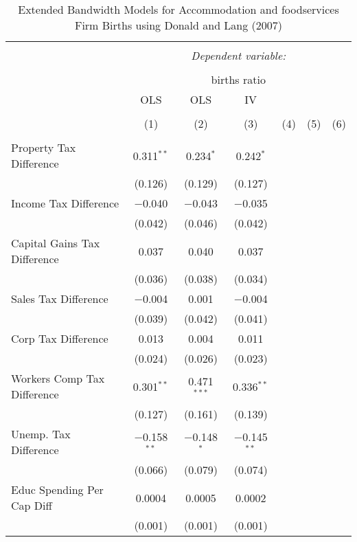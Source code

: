 
\begin{table}[!htbp] \centering 
  \caption{Extended Bandwidth Models for  Accommodation and foodservices Firm Births using Donald and Lang (2007)} 
  \label{} 
\begin{tabular}{@{\extracolsep{5pt}}lcccccc} 
\\[-1.8ex]\hline 
\hline \\[-1.8ex] 
 & \multicolumn{6}{c}{\textit{Dependent variable:}} \\ 
\cline{2-7} 
\\[-1.8ex] & \multicolumn{6}{c}{births ratio} \\ 
 & OLS & OLS & IV &  &  &  \\ 
\\[-1.8ex] & (1) & (2) & (3) & (4) & (5) & (6)\\ 
\hline \\[-1.8ex] 
 Property Tax Difference & 0.311$^{**}$ & 0.234$^{*}$ & 0.242$^{*}$ &  &  &  \\ 
  & (0.126) & (0.129) & (0.127) &  &  &  \\ 
  Income Tax Difference & $-$0.040 & $-$0.043 & $-$0.035 &  &  &  \\ 
  & (0.042) & (0.046) & (0.042) &  &  &  \\ 
  Capital Gains Tax Difference & 0.037 & 0.040 & 0.037 &  &  &  \\ 
  & (0.036) & (0.038) & (0.034) &  &  &  \\ 
  Sales Tax Difference & $-$0.004 & 0.001 & $-$0.004 &  &  &  \\ 
  & (0.039) & (0.042) & (0.041) &  &  &  \\ 
  Corp Tax Difference & 0.013 & 0.004 & 0.011 &  &  &  \\ 
  & (0.024) & (0.026) & (0.023) &  &  &  \\ 
  Workers Comp Tax Difference & 0.301$^{**}$ & 0.471$^{***}$ & 0.336$^{**}$ &  &  &  \\ 
  & (0.127) & (0.161) & (0.139) &  &  &  \\ 
  Unemp. Tax Difference & $-$0.158$^{**}$ & $-$0.148$^{*}$ & $-$0.145$^{**}$ &  &  &  \\ 
  & (0.066) & (0.079) & (0.074) &  &  &  \\ 
  Educ Spending Per Cap Diff & 0.0004 & 0.0005 & 0.0002 &  &  &  \\ 
  & (0.001) & (0.001) & (0.001) &  &  &  \\ 

\end{tabular}
\end{table}
